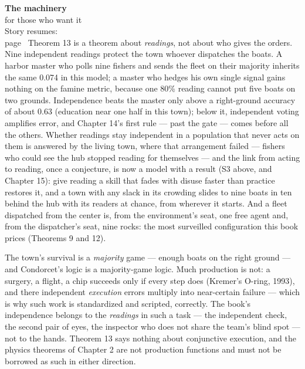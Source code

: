 \begin{machinery}{\textbf{The machinery}\\for those who want it\\[3pt]{\color{muted}Story resumes:\\page~\pageref{ch12}}}
Theorem 13 is a
theorem about \emph{readings}, not about who gives the orders. Nine
independent readings protect the town whoever dispatches the boats. A
harbor master who polls nine fishers and sends the fleet on their
majority inherits the same 0.074 in this model; a master who hedges
his own single signal gains nothing on the famine metric, because one
80\% reading cannot put five boats on two grounds. Independence beats
the master only above a right-ground accuracy of about 0.63 (education
near one half in this town); below it, independent voting amplifies
error, and Chapter 14's first rule --- past the gate --- comes before all
the others. Whether readings stay
independent in a population that never acts on them is answered by the
living town, where that arrangement failed --- fishers who could see the hub
stopped reading for themselves --- and the link from acting to reading,
once a conjecture, is now a model with a result (S3 above, and
Chapter 15): give reading a skill that fades with disuse faster than
practice restores it, and a town with any slack in its crowding slides
to nine boats in ten behind the hub with its readers at chance, from
wherever it starts. And a fleet dispatched from the
center is, from the environment's seat, one free agent and, from the
dispatcher's seat, nine rocks: the most surveilled configuration this
book prices (Theorems 9 and 12).

The
town's survival is a \emph{majority} game --- enough boats on the right ground
--- and Condorcet's logic is a majority-game logic. Much production is
not: a surgery, a flight, a chip succeeds only if every step does
(Kremer's O-ring, 1993), and there independent \emph{execution} errors
multiply into near-certain failure --- which is why such work is
standardized and scripted, correctly. The book's independence belongs
to the \emph{readings} in such a task --- the independent check, the second
pair of eyes, the inspector who does not share the team's blind spot ---
not to the hands. Theorem 13 says nothing about conjunctive execution,
and the physics theorems of Chapter 2 are not production functions and
must not be borrowed as such in either direction.


\end{machinery}

